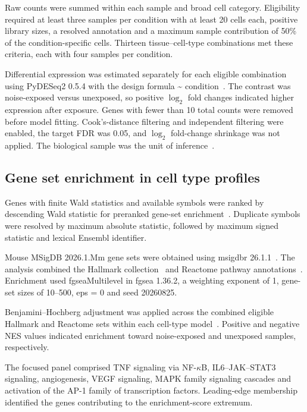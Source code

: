 Raw counts were summed within each sample and broad cell category. Eligibility required at least three samples per condition with at least 20 cells each, positive library sizes, a resolved annotation and a maximum sample contribution of 50\% of the condition-specific cells. Thirteen tissue--cell-type combinations met these criteria, each with four samples per condition.

Differential expression was estimated separately for each eligible combination using PyDESeq2 0.5.4 with the design formula \textasciitilde{} condition~\citep{Love2014,Muzellec2023}. The contrast was noise-exposed versus unexposed, so positive \(\log_2\) fold changes indicated higher expression after exposure. Genes with fewer than 10 total counts were removed before model fitting. Cook's-distance filtering and independent filtering were enabled, the target FDR was 0.05, and \(\log_2\) fold-change shrinkage was not applied. The biological sample was the unit of inference~\citep{Crowell2020,Squair2021}.

\subsection{Gene set enrichment in cell type profiles}

Genes with finite Wald statistics and available symbols were ranked by descending Wald statistic for preranked gene-set enrichment~\citep{Subramanian2005}. Duplicate symbols were resolved by maximum absolute statistic, followed by maximum signed statistic and lexical Ensembl identifier.

Mouse MSigDB 2026.1.Mm gene sets were obtained using msigdbr 26.1.1~\citep{Castanza2023}. The analysis combined the Hallmark collection~\citep{Liberzon2015} and Reactome pathway annotations~\citep{Milacic2024}. Enrichment used fgseaMultilevel in fgsea 1.36.2, a weighting exponent of 1, gene-set sizes of 10--500, eps = 0 and seed 20260825.

Benjamini--Hochberg adjustment was applied across the combined eligible Hallmark and Reactome sets within each cell-type model~\citep{Benjamini1995}. Positive and negative NES values indicated enrichment toward noise-exposed and unexposed samples, respectively.

The focused panel comprised TNF signaling via NF-\(\kappa\)B, IL6--JAK--STAT3 signaling, angiogenesis, VEGF signaling, MAPK family signaling cascades and activation of the AP-1 family of transcription factors. Leading-edge membership identified the genes contributing to the enrichment-score extremum.

